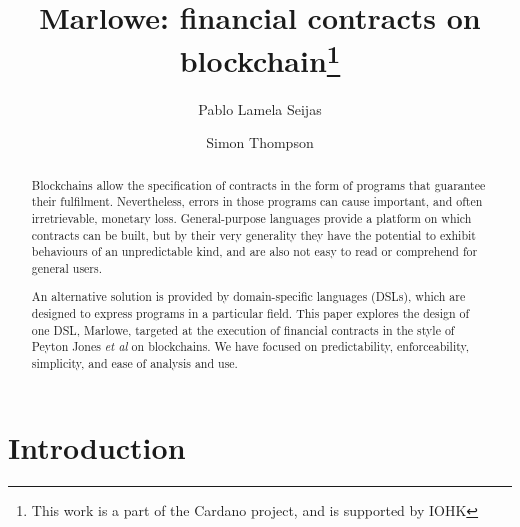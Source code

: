 \documentclass[runningheads]{llncs}
\begin{document}
%
%
\title {Marlowe: financial contracts on blockchain\thanks{This work is a part of the Cardano project, and is
supported by IOHK}}
%
%
\author{Pablo Lamela Seijas\\
\and Simon Thompson}
%
%


\begin{abstract}

Blockchains allow the specification of contracts in the form of programs that guarantee their fulfilment. 
Nevertheless, errors in those programs can cause important, and often irretrievable, monetary loss. General-purpose 
languages provide a platform on which contracts can be built, but by their very generality they have the potential to 
exhibit behaviours of an unpredictable kind, and are also not easy to read or comprehend for general users. 

An alternative solution is provided by domain-specific languages (DSLs), which are designed to express programs in a 
particular field. This paper explores the design of one DSL, Marlowe, targeted at the execution of financial 
contracts in the style of Peyton Jones \emph{et al} on blockchains. We have focused on predictability, enforceability, 
simplicity, and ease of analysis and use.

\end{abstract}



%
%


\maketitle


\section{Introduction}
\end{document}
